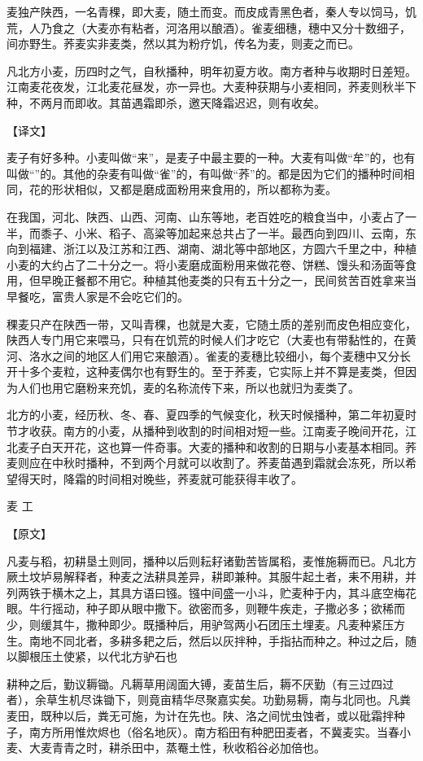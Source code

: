 \documentclass[12pt,UTF8]{ctexbook}
\begin{document}
麦独产陕西，一名青稞，即大麦，随土而变。而皮成青黑色者，秦人专以饲马，饥荒，人乃食之（大麦亦有粘者，河洛用以酿酒）。雀麦细穗，穗中又分十数细子，间亦野生。荞麦实非麦类，然以其为粉疗饥，传名为麦，则麦之而已。

凡北方小麦，历四时之气，自秋播种，明年初夏方收。南方者种与收期时日差短。江南麦花夜发，江北麦花昼发，亦一异也。大麦种获期与小麦相同，荞麦则秋半下种，不两月而即收。其苗遇霜即杀，邀天降霜迟迟，则有收矣。

【译文】

麦子有好多种。小麦叫做“来”，是麦子中最主要的一种。大麦有叫做“牟”的，也有叫做“”的。其他的杂麦有叫做“雀”的，有叫做“荞”的。都是因为它们的播种时间相同，花的形状相似，又都是磨成面粉用来食用的，所以都称为麦。

在我国，河北、陕西、山西、河南、山东等地，老百姓吃的粮食当中，小麦占了一半，而黍子、小米、稻子、高粱等加起来总共占了一半。最西向到四川、云南，东向到福建、浙江以及江苏和江西、湖南、湖北等中部地区，方圆六千里之中，种植小麦的大约占了二十分之一。将小麦磨成面粉用来做花卷、饼糕、馒头和汤面等食用，但早晚正餐都不用它。种植其他麦类的只有五十分之一，民间贫苦百姓拿来当早餐吃，富贵人家是不会吃它们的。

稞麦只产在陕西一带，又叫青稞，也就是大麦，它随土质的差别而皮色相应变化，陕西人专门用它来喂马，只有在饥荒的时候人们才吃它（大麦也有带黏性的，在黄河、洛水之间的地区人们用它来酿酒）。雀麦的麦穗比较细小，每个麦穗中又分长开十多个麦粒，这种麦偶尔也有野生的。至于荞麦，它实际上并不算是麦类，但因为人们也用它磨粉来充饥，麦的名称流传下来，所以也就归为麦类了。

北方的小麦，经历秋、冬、春、夏四季的气候变化，秋天时候播种，第二年初夏时节才收获。南方的小麦，从播种到收割的时间相对短一些。江南麦子晚间开花，江北麦子白天开花，这也算一件奇事。大麦的播种和收割的日期与小麦基本相同。荞麦则应在中秋时播种，不到两个月就可以收割了。荞麦苗遇到霜就会冻死，所以希望得天时，降霜的时间相对晚些，荞麦就可能获得丰收了。

麦 工

【原文】

凡麦与稻，初耕垦土则同，播种以后则耘耔诸勤苦皆属稻，麦惟施耨而已。凡北方厥土坟垆易解释者，种麦之法耕具差异，耕即兼种。其服牛起土者，耒不用耕，并列两铁于横木之上，其具方语曰镪。镪中间盛一小斗，贮麦种于内，其斗底空梅花眼。牛行摇动，种子即从眼中撒下。欲密而多，则鞭牛疾走，子撒必多；欲稀而少，则缓其牛，撒种即少。既播种后，用驴驾两小石团压土埋麦。凡麦种紧压方生。南地不同北者，多耕多耙之后，然后以灰拌种，手指拈而种之。种过之后，随以脚根压土使紧，以代北方驴石也

耕种之后，勤议耨锄。凡耨草用阔面大镈，麦苗生后，耨不厌勤（有三过四过者），余草生机尽诛锄下，则竟亩精华尽聚嘉实矣。功勤易耨，南与北同也。凡粪麦田，既种以后，粪无可施，为计在先也。陕、洛之间忧虫蚀者，或以砒霜拌种子，南方所用惟炊烬也（俗名地灰）。南方稻田有种肥田麦者，不冀麦实。当春小麦、大麦青青之时，耕杀田中，蒸罨土性，秋收稻谷必加倍也。
\end{document}
